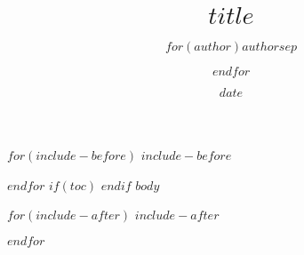 \documentclass[$if(fontsize)$$fontsize$,$endif$$if(lang)$$lang$,$endif$$if(papersize)$$papersize$,$endif$]{$documentclass$}
\title{$title$}
\author{$for(author)$$author$$sep$ \and $endfor$}
\date{$date$}
\begin{document}
$for(include-before)$
$include-before$

$endfor$
$if(toc)$
{
\hypersetup{linkcolor=black}
\setcounter{tocdepth}{$toc-depth$}
\tableofcontents
}
$endif$
$body$

$for(include-after)$
$include-after$

$endfor$
\end{document}

